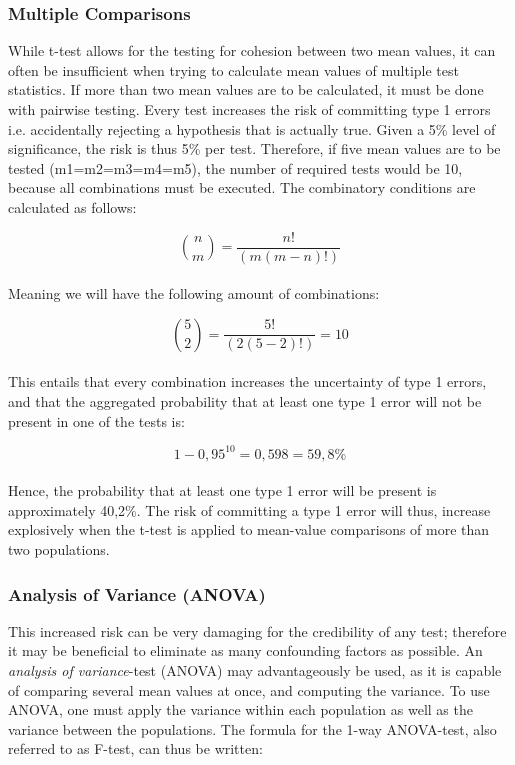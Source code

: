 \subsubsection{Multiple Comparisons}
While t-test allows for the testing for cohesion between two mean values, it can often be insufficient when trying to calculate mean values of multiple test statistics. If more than two mean values are to be calculated, it must be done with pairwise testing. Every test increases the risk of committing type 1 errors i.e. accidentally rejecting a hypothesis that is actually true. Given a 5\% level of significance, the risk is thus 5\% per test. Therefore, if five mean values are to be tested (m1=m2=m3=m4=m5), the number of required tests would be 10, because all combinations must be executed. The combinatory conditions are calculated as follows:

\begin{equation}
\binom{n}{m} = {\frac{n!}{(m(m-n)!)}} 
\end{equation}\\
Meaning we will have the following amount of combinations:

\begin{equation}
\binom{5}{2} = {\frac{5!}{(2(5-2)!)}} = 10 
\end{equation}\\
This entails that every combination increases the uncertainty of type 1 errors, and that the aggregated probability that at least one type 1 error will not be present in one of the tests is:

\begin{equation}
1-0,95^{10}= 0,598 = 59,8\%
\end{equation}\\
Hence, the probability  that at least one type 1 error will be present is approximately 40,2\%. The risk of committing a type 1 error will thus, increase explosively when the t-test is applied to mean-value comparisons of more than two populations.
\\

\subsubsection{Analysis of Variance (ANOVA)}
This increased risk can be very damaging for the credibility of any test; therefore it may be beneficial to eliminate as many confounding factors as possible. An \textit{analysis of variance}-test (ANOVA) may advantageously be used, as it is capable of comparing several mean values at once, and computing the variance.  To use ANOVA, one must apply the variance within each population as well as the variance between the populations. The formula for the 1-way ANOVA-test, also referred to as F-test, can thus be written:

